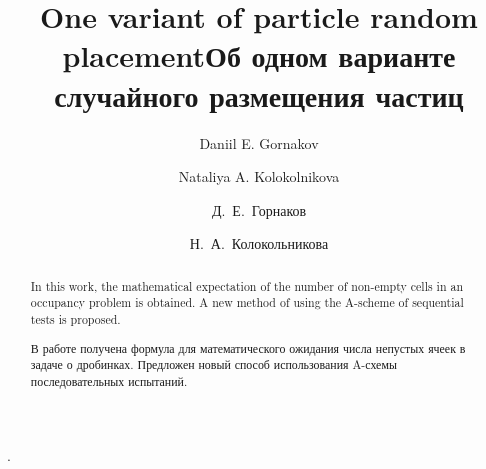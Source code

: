 \begin{englishtitle}
\title{One variant of particle random placement}
\author{Daniil E. Gornakov \and Nataliya A. Kolokolnikova}

\maketitle

\begin{abstract}
In this work, the mathematical expectation of the number of non-empty cells in an occupancy problem is obtained. A new method of using the A-scheme of sequential tests is proposed.

\end{abstract}
\end{englishtitle}


\iffalse
\documentclass[12pt]{llncs}
\usepackage[T2A]{fontenc}
\usepackage[utf8]{inputenc}
\usepackage[english,russian]{babel}
\usepackage[russian]{nla}






\fi

\title{Об одном варианте случайного размещения частиц%
}
\author{Д.~Е.~Горнаков \and  Н.~А.~Колокольникова%
} 
.

\maketitle

\begin{abstract}
В работе получена формула для математического ожидания числа непустых ячеек в задаче о дробинках. Предложен новый способ использования A-схемы последовательных испытаний.  
\end{abstract}

